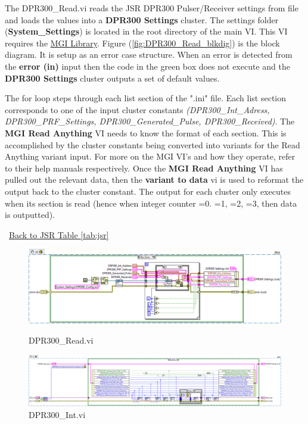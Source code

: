 \documentclass[11pt,a4paper,oldfontcommands]{memoir}
\begin{document}
The DPR300\_Read.vi reads the JSR DPR300 Pulser/Receiver settings from file and loads the values into a \textbf{DPR300 Settings} cluster. The settings folder (\textbf{System\_Settings}) is located in the root directory of the main VI. This VI requires the \href{http://sine.ni.com/apps/utf8/niid_web_display.download_page?p_id_guid=EE0D9BE18DD85923E0340003BA7CCD71}{MGI Library}. Figure (\ref{fig:DPR300_Read_blkdig}) is the block diagram.  It is setup as an error case structure. When an error is detected from the \textbf{error (in)} input then the code in the green box does not execute and the \textbf{DPR300 Settings} cluster outputs a set of default values.

The for loop steps through each list section of the ".ini" file. Each list section corresponds to one of the input cluster constants \textit{(DPR300\_Int\_Adress, DPR300\_PRF\_Settings, DPR300\_Generated\_Pulse, DPR300\_Received)}. The \textbf{MGI Read Anything} VI needs to know the format of each section. This is accomplished by the cluster constants being converted into variants for the Read Anything variant input. For more on the MGI VI's and how they operate, refer to their help manuals respectively. Once the \textbf{MGI Read Anything} VI has pulled out the relevant data, then the \textbf{variant to data} vi is used to reformat the output back to the cluster constant. The output for each cluster only executes when its section is read (hence when integer counter =0. =1, =2, =3, then data is outputted).

\noindent\hrulefill\, \hyperref[tab:jsr]{Back to JSR Table \ref{tab:jsr}}

\begin{figure}
	\includegraphics[width=\textheight,keepaspectratio]{DPR300_Read_blockdiagram}
	\caption{DPR300\_Read.vi}
	\label{fig:DPR300_Read_blkdig}
	\includegraphics[width=\textheight,keepaspectratio]{DPR300_Int_blockdiagram_01}
	\caption{DPR300\_Int.vi}
	\label{fig:DPR300_Int_blkdig}
\end{figure}
\end{document}
